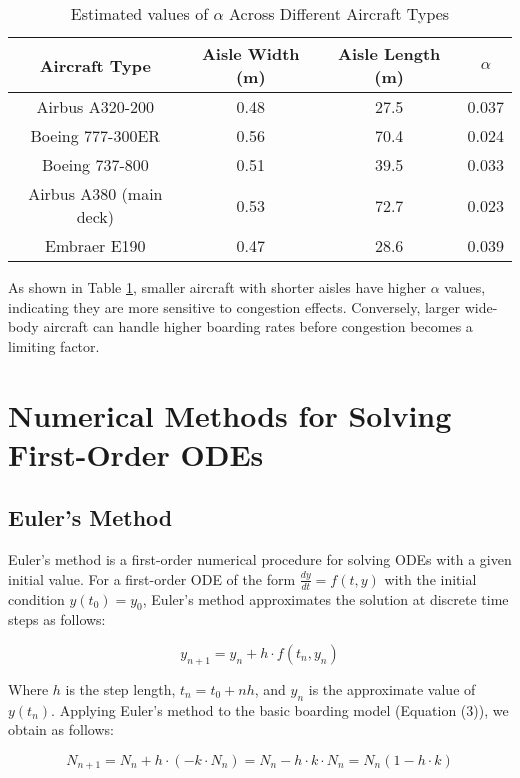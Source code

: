 \documentclass[12pt]{article}
\begin{document}
\begin{table}[H]
\centering
\caption{Estimated values of $\alpha$ Across Different Aircraft Types}
\label{tab:alpha-values}
\begin{tabular}{cccc}
\toprule
\textbf{Aircraft Type} & \textbf{Aisle Width (m)} & \textbf{Aisle Length (m)} & \textbf{$\alpha$} \\
\midrule
Airbus A320-200 & 0.48 & 27.5 & 0.037 \\
Boeing 777-300ER & 0.56 & 70.4 & 0.024 \\
Boeing 737-800 & 0.51 & 39.5 & 0.033 \\
Airbus A380 (main deck) & 0.53 & 72.7 & 0.023 \\
Embraer E190 & 0.47 & 28.6 & 0.039 \\
\bottomrule
\end{tabular}
\end{table}

As shown in Table \ref{tab:alpha-values}, smaller aircraft with shorter aisles have higher $\alpha$ values, indicating they are more sensitive to congestion effects. Conversely, larger wide-body aircraft can handle higher boarding rates before congestion becomes a limiting factor.

\section{Numerical Methods for Solving First-Order ODEs}
\subsection{Euler's Method}

Euler's method is a first-order numerical procedure for solving ODEs with a given initial value. For a first-order ODE of the form $\frac{dy}{dt} = f(t, y)$ with the initial condition $y(t_0) = y_0$, Euler's method approximates the solution at discrete time steps as follows:

\begin{equation}
y_{n+1} = y_n + h \cdot f(t_n, y_n)
\end{equation}

Where $h$ is the step length, $t_n = t_0 + nh$, and $y_n$ is the approximate value of $y(t_n)$. Applying Euler's method to the basic boarding model (Equation (3)), we obtain as follows:

\begin{equation}
N_{n+1} = N_n + h \cdot (-k \cdot N_n) = N_n - h \cdot k \cdot N_n = N_n(1 - h \cdot k)
\end{equation}
\end{document}
